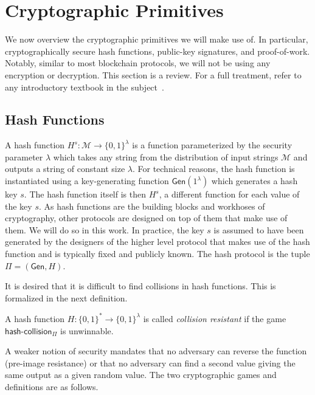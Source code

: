 \section{Cryptographic Primitives}

We now overview the cryptographic primitives we will make use of. In particular,
cryptographically secure hash functions, public-key signatures, and
proof-of-work. Notably, similar to most blockchain protocols, we will not be
using any encryption or decryption. This section is a review. For a full
treatment, refer to any introductory textbook in the subject~\cite{katz,handbook,foundations1,foundations2}.

\subsection{Hash Functions}
A hash function $H^s: \mathcal{M} \longrightarrow \{0, 1\}^\lambda$ is a function
parameterized by the security parameter $\lambda$ which takes any string from the distribution of input strings $\mathcal{M}$ and
outputs a string of constant size $\lambda$. For technical reasons, the hash
function is instantiated using a key-generating function
$\textsf{Gen}(1^\lambda)$ which generates a hash key $s$. The hash function itself is then $H^s$, a different function for each value of the key $s$. As hash functions are the building blocks and workhoses of cryptography, other protocols are designed on top of them that make use of them. We will do so in this work. In practice, the key $s$ is assumed to have been generated by the designers of the higher level protocol that makes use of the hash function and is typically fixed and publicly known. The hash protocol is the tuple $\Pi = (\textsf{Gen}, H)$.

It is desired that it is difficult to find collisions in hash functions. This is
formalized in the next definition.



\begin{definition}
  A hash function $H: \{0, 1\}^* \longrightarrow \{0, 1\}^\lambda$ is called
  \emph{collision resistant} if the game $\textsf{hash-collision}_\Pi$ is unwinnable.
\end{definition}

A weaker notion of security mandates that no adversary can reverse the function (pre-image resistance) or that no adversary can find a second value giving the same output as a given random value. The two cryptographic games and definitions are as follows.


